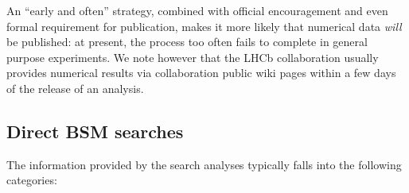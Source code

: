 \documentclass[a4paper,aps,prd,longbibliography,notitlepage,showpacs,amsmath,amssymb,superscriptaddress,nofootinbib,floatfix,11pt,preprintnumbers]{revtex4-1-mod}
\renewcommand{\emph}[1]{\textit{#1}}
\begin{document}
An ``early and often'' strategy, combined with official encouragement and even formal requirement for publication, makes it more likely that numerical data \emph{will} be published: at present, the process too often fails to complete in general purpose experiments. We note however that the LHCb collaboration usually provides numerical results via collaboration public wiki pages within a few days of the release of an analysis.

\subsection{Direct BSM searches}\label{sec:searches}


\noindent The information provided by the search analyses typically falls into the following categories:
%
\end{document}
